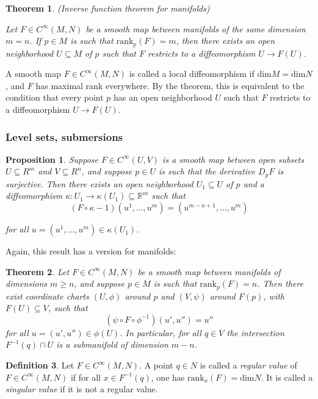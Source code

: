 \documentclass{article}
\newtheorem{theorem}{Theorem}[section]
\newtheorem{proposition}{Proposition}[theorem]
\theoremstyle{definition}
\newtheorem{defn}[theorem]{Definition}
\newenvironment{definition}
  {\vspace{8pt}\begin{mdframed}[backgroundcolor=blueish,innertopmargin=4]\begin{defn}}
  {\end{defn}\end{mdframed}\vspace{4pt}}
\begin{document}
\begin{theorem} (Inverse function theorem for manifolds)

Let $F \in C^\infty(M,N)$ be a smooth map between manifolds of the same dimension $m = n$. If $p \in M$ is such that $\text{rank}_p(F) = m$, then there exists an open neighborhood $U \subseteq M$ of $p$ such that $F$ restricts to a diffeomorphism $U \rightarrow F(U)$.
\end{theorem}


A smooth map $F \in C^\infty(M,N)$ is called a local diffeomorphism if $\text{dim} M = \text{dim}N$, and $F$ has maximal rank everywhere. By the theorem, this is equivalent to the condition that every point $p$ has an open neighborhood $U$ such that $F$ restricts to a diffeomorphism $U \rightarrow F(U)$.

\subsubsection{Level sets, submersions}
\begin{proposition}
Suppose $F \in C^\infty(U,V)$ is a smooth map between open subsets $U \subseteq R^m$ and $V \subseteq R^n$, and suppose $p \in U$ is such that the derivative $D_p F$ is surjective. Then there exists an open neighborhood $U_1 \subseteq U$ of $p$ and a diffeomorphism $\kappa : U_1 \rightarrow \kappa (U_1) \subseteq \mathbb R^m$ such that
\[
   (F \circ \kappa - 1)(u^1, \dots, u^m) = (u^{m-n+1},\dots,u^m)
\]

for all $u = (u^1 ,\dots,u^m) \in \kappa(U_1)$.
\end{proposition}

Again, this result has a version for manifolds:

\begin{theorem}
Let $F \in C ^\infty(M,N)$ be a smooth map between manifolds of dimensions $m \geq n$, and suppose $p \in M$ is such that $\text{rank}_p(F) = n$. Then there exist coordinate charts $(U,\phi)$ around $p$ and $(V,\psi)$ around $F(p)$, with $F(U) \subseteq V$, such that 
\[
    (\psi \circ F \circ \phi^{-1} )(u' ,u'') = u'' 
\]
for all $u = (u',u'') \in \phi(U)$. In particular, for all $q \in V$ the intersection $F^{-1} (q)\cap U$ is a submanifold of dimension $m-n$.

\end{theorem}

\begin{definition}
    Let $F \in C^\infty(M,N)$. A point $q \in N$ is called a \textit{regular value} of $F \in C^\infty(M,N)$ if for all $x \in F^{-1} (q)$, one has $\text{rank}_x(F) = \text{dim}N$. It is called a \textit{singular value} if it is not a regular value.
\end{definition}
\end{document}

